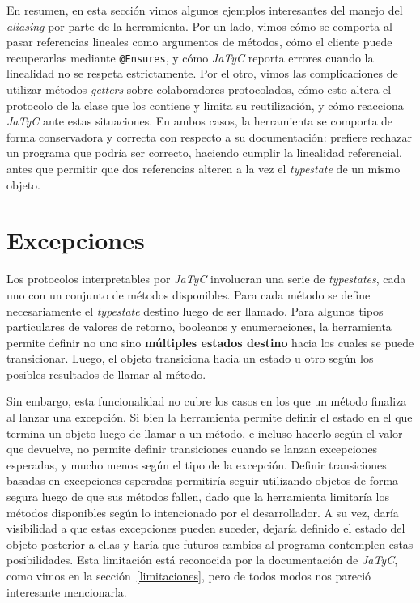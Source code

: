 En resumen, en esta sección vimos algunos ejemplos interesantes del manejo del \textit{aliasing} por parte de la herramienta. Por un lado, vimos cómo se comporta al pasar referencias lineales como argumentos de métodos, cómo el cliente puede recuperarlas mediante \texttt{@Ensures}, y cómo \textit{JaTyC} reporta errores cuando la linealidad no se respeta estrictamente. Por el otro, vimos las complicaciones de utilizar métodos \textit{getters} sobre colaboradores protocolados, cómo esto altera el protocolo de la clase que los contiene y limita su reutilización, y cómo reacciona \textit{JaTyC} ante estas situaciones. En ambos casos, la herramienta se comporta de forma conservadora y correcta con respecto a su documentación: prefiere rechazar un programa que podría ser correcto, haciendo cumplir la linealidad referencial, antes que permitir que dos referencias alteren a la vez el \textit{typestate} de un mismo objeto.

\section{Excepciones}

Los protocolos interpretables por \textit{JaTyC} involucran una serie de \textit{typestates}, cada uno con un conjunto de métodos disponibles. Para cada método se define necesariamente el \textit{typestate} destino luego de ser llamado. Para algunos tipos particulares de valores de retorno, booleanos y enumeraciones, la herramienta permite definir no uno sino \textbf{múltiples estados destino} hacia los cuales se puede transicionar. Luego, el objeto transiciona hacia un estado u otro según los posibles resultados de llamar al método.

Sin embargo, esta funcionalidad no cubre los casos en los que un método finaliza al lanzar una excepción. Si bien la herramienta permite definir el estado en el que termina un objeto luego de llamar a un método, e incluso hacerlo según el valor que devuelve, no permite definir transiciones cuando se lanzan excepciones esperadas, y mucho menos según el tipo de la excepción. Definir transiciones basadas en excepciones esperadas permitiría seguir utilizando objetos de forma segura luego de que sus métodos fallen, dado que la herramienta limitaría los métodos disponibles según lo intencionado por el desarrollador. A su vez, daría visibilidad a que estas excepciones pueden suceder, dejaría definido el estado del objeto posterior a ellas y haría que futuros cambios al programa contemplen estas posibilidades. Esta limitación está reconocida por la documentación de \textit{JaTyC}, como vimos en la sección~\ref{limitaciones}, pero de todos modos nos pareció interesante mencionarla.

